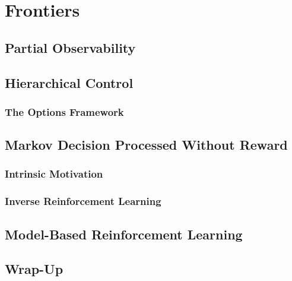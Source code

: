 \chapter{Frontiers} %

	\section{Partial Observability} %

	\section{Hierarchical Control} %

		\subsection{The Options Framework} %

	\section{Markov Decision Processed Without Reward} %

		\subsection{Intrinsic Motivation} %

		\subsection{Inverse Reinforcement Learning} %

	\section{Model-Based Reinforcement Learning} %

	\section{Wrap-Up} %
